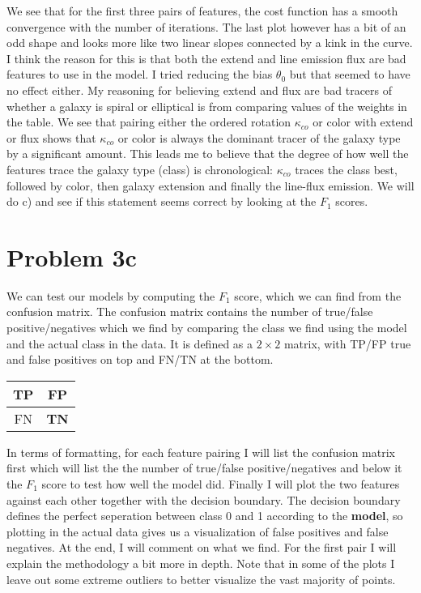 \clearpage

We see that for the first three pairs of features, the cost function has a smooth convergence with the number of iterations. The last plot however has a bit of an odd shape and looks more like two linear slopes connected by a kink in the curve. I think the reason for this is that both the extend and line emission flux are bad features to use in the model. I tried reducing the bias $\theta_0$ but that seemed to have no effect either. My reasoning for believing extend and flux are bad tracers of whether a galaxy is spiral or elliptical is from comparing values of the weights in the table. We see that pairing either the ordered rotation $\kappa_{co}$ or color with extend or flux shows that $\kappa_{co}$ or color is always the dominant tracer of the galaxy type by a significant amount. This leads me to believe that the degree of how well the features trace the galaxy type (class) is chronological: $\kappa_{co}$ traces the class best, followed by color, then galaxy extension and finally the line-flux emission. We will do c) and see if this statement seems correct by looking at the $F_1$ scores. 

\section*{Problem 3c}

We can test our models by computing the $F_1$ score, which we can find from the confusion matrix. The confusion matrix contains the number of true/false positive/negatives which we find by comparing the class we find using the model and the actual class in the data. It is defined as a $2 \times 2$ matrix, with TP/FP true and false positives on top and FN/TN at the bottom. 

\begin{table}[!h]
\centering
\begin{tabular}{c|c}
\textbf{TP} & FP\\ \hline
FN &   \textbf{TN}\\
\end{tabular}
\end{table}

In terms of formatting, for each feature pairing I will list the confusion matrix first which will list the the number of true/false positive/negatives and below it the $F_1$ score to test how well the model did. Finally I will plot the two features against each other together with the decision boundary. The decision boundary defines the perfect seperation between class 0 and 1 according to the \textbf{model}, so plotting in the actual data gives us a visualization of false positives and false negatives. At the end, I will comment on what we find. For the first pair I will explain the methodology a bit more in depth. Note that in some of the plots I leave out some extreme outliers to better visualize the vast majority of points. 

